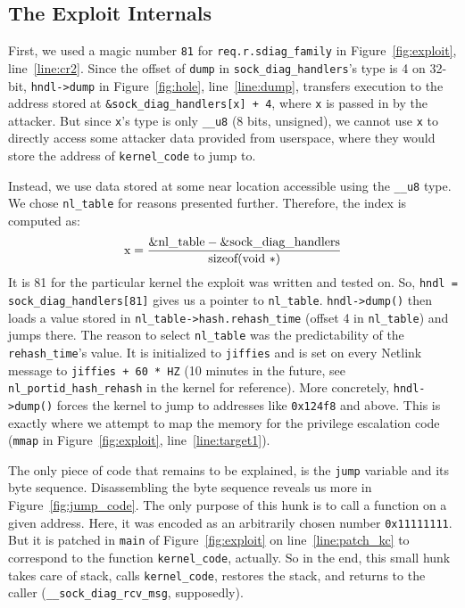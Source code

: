 \documentclass[10pt]{llncs}
\newcommand{\code}[2][]{\lstinline[columns=fullflexible, #1]$#2$}
\begin{document}
\subsection{The Exploit Internals} \label{sec:how}
First, we used a magic number \code{81} for \code{req.r.sdiag_family} in
Figure~\ref{fig:exploit}, line~\ref{line:cr2}. Since the offset of \code{dump}
in \code{sock_diag_handlers}'s type is 4 on 32-bit, \code{hndl->dump} in
Figure~\ref{fig:hole}, line~\ref{line:dump}, transfers execution to the
address stored at \code{&sock_diag_handlers[x] + 4}, where \code{x} is passed
in by the attacker. But since \code{x}'s type is only \code{__u8} (8 bits,
unsigned), we cannot use \code{x} to directly access some attacker data
provided from userspace, where they would store the address of
\code{kernel_code} to jump to.

Instead, we use data stored at some near location accessible using the
\code{__u8} type. We chose \code{nl_table} for reasons presented further.
Therefore, the index is computed as:
\begin{equation*}
\text{\code{x}}=\frac{\text{\code{\&nl_table}} -
\text{\code{\&sock_diag_handlers}}} {\text{\code{sizeof(void *)}}}
\end{equation*}
It is 81 for the particular kernel the exploit was written and tested on. So,
\code{hndl = sock_diag_handlers[81]} gives us a pointer to \code{nl_table}.
\code{hndl->dump()} then loads a value stored in
\code{nl_table->hash.rehash_time} (offset 4 in \code{nl_table}) and jumps
there. The reason to select \code{nl_table} was the predictability of the
\code{rehash_time}'s value. It is initialized to \code{jiffies} and is set on
every Netlink message to \code{jiffies + 60 * HZ} (10 minutes in the future,
see \code{nl_portid_hash_rehash} in the kernel for reference). More
concretely, \code{hndl->dump()} forces the kernel to jump to addresses like
\code{0x124f8} and above.  This is exactly where we attempt to map the memory
for the privilege escalation code (\code{mmap} in Figure~\ref{fig:exploit},
line~\ref{line:target1}).

The only piece of code that remains to be explained, is the \code{jump}
variable and its byte sequence. Disassembling the byte sequence reveals us
more in Figure~\ref{fig:jump_code}.  The only purpose of this hunk is to call
a function on a given address. Here, it was encoded as an arbitrarily chosen
number \code{0x11111111}. But it is patched in \code{main} of
Figure~\ref{fig:exploit} on line~\ref{line:patch_kc} to correspond to the
function \code{kernel_code}, actually. So in the end, this small hunk takes
care of stack, calls \code{kernel_code}, restores the stack, and returns to
the caller (\code{__sock_diag_rcv_msg}, supposedly).
\end{document}

